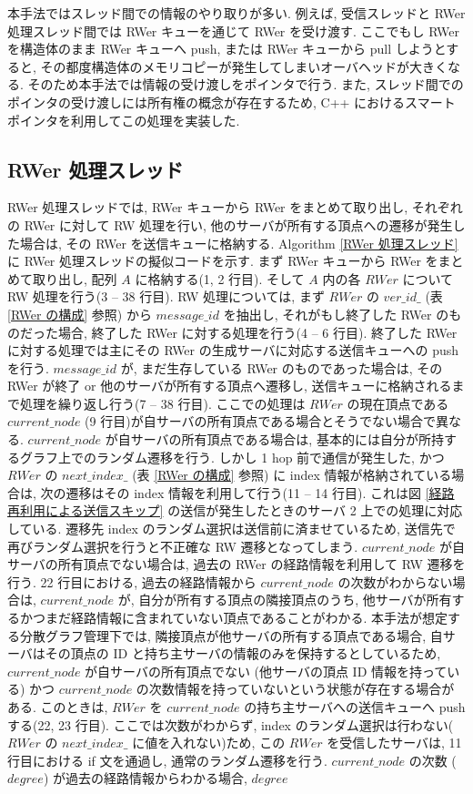 本手法ではスレッド間での情報のやり取りが多い. 例えば, 受信スレッドと RWer 処理スレッド間では RWer キューを通じて RWer を受け渡す. ここでもし RWer を構造体のまま RWer キューへ push, または RWer キューから pull しようとすると, その都度構造体のメモリコピーが発生してしまいオーバヘッドが大きくなる. そのため本手法では情報の受け渡しをポインタで行う. また, スレッド間でのポインタの受け渡しには所有権の概念が存在するため, C++ におけるスマートポインタを利用してこの処理を実装した. 



\subsection{RWer 処理スレッド}

RWer 処理スレッドでは, RWer キューから RWer をまとめて取り出し, それぞれの RWer に対して RW 処理を行い, 他のサーバが所有する頂点への遷移が発生した場合は, その RWer を送信キューに格納する. Algorithm \ref{RWer 処理スレッド} に RWer 処理スレッドの擬似コードを示す. まず RWer キューから RWer をまとめて取り出し, 配列 $A$ に格納する(1, 2 行目). そして $A$ 内の各 $RWer$ について RW 処理を行う(3 -- 38 行目). RW 処理については, まず $RWer$ の $ver\_id\_$ (表 \ref{RWer の構成} 参照) から $message\_id$ を抽出し, それがもし終了した RWer のものだった場合, 終了した RWer に対する処理を行う(4 -- 6 行目). 終了した RWer に対する処理では主にその RWer の生成サーバに対応する送信キューへの push を行う. $message\_id$ が, まだ生存している RWer のものであった場合は, その RWer が終了 or 他のサーバが所有する頂点へ遷移し, 送信キューに格納されるまで処理を繰り返し行う(7 -- 38 行目). ここでの処理は $RWer$ の現在頂点である $current\_node$ (9 行目)が自サーバの所有頂点である場合とそうでない場合で異なる. $current\_node$ が自サーバの所有頂点である場合は, 基本的には自分が所持するグラフ上でのランダム遷移を行う. しかし 1 hop 前で通信が発生した, かつ $RWer$ の $next\_index\_$ (表 \ref{RWer の構成} 参照) に index 情報が格納されている場合は, 次の遷移はその index 情報を利用して行う(11 -- 14 行目). これは図 \ref{経路再利用による送信スキップ} の送信が発生したときのサーバ 2 上での処理に対応している. 遷移先 index のランダム選択は送信前に済ませているため, 送信先で再びランダム選択を行うと不正確な RW 遷移となってしまう. $current\_node$ が自サーバの所有頂点でない場合は, 過去の RWer の経路情報を利用して RW 遷移を行う. 22 行目における, 過去の経路情報から $current\_node$ の次数がわからない場合は, $current\_node$ が, 自分が所有する頂点の隣接頂点のうち, 他サーバが所有するかつまだ経路情報に含まれていない頂点であることがわかる. 本手法が想定する分散グラフ管理下では, 隣接頂点が他サーバの所有する頂点である場合, 自サーバはその頂点の ID と持ち主サーバの情報のみを保持するとしているため, $current\_node$ が自サーバの所有頂点でない (他サーバの頂点 ID 情報を持っている) かつ $current\_node$ の次数情報を持っていないという状態が存在する場合がある. このときは, $RWer$ を $current\_node$ の持ち主サーバへの送信キューへ push する(22, 23 行目). ここでは次数がわからず, index のランダム選択は行わない($RWer$ の $next\_index\_$ に値を入れない)ため, この $RWer$ を受信したサーバは, 11 行目における if 文を通過し, 通常のランダム遷移を行う. $current\_node$ の次数 ($degree$) が過去の経路情報からわかる場合, $degree$ 